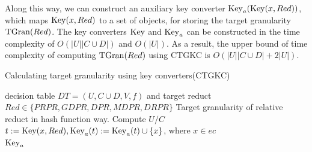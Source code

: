 \documentclass[review]{elsarticle}
\begin{document}
		\noindent Along this way, we can construct an auxiliary key converter ${\rm Key}_a({\rm Key}(x,Red))$, which maps ${\rm Key}(x,Red)$ to a set of objects, for storing the target granularity ${\rm TGran}(Red)$. The key converters ${\rm Key}$ and ${\rm Key}_a$ can be constructed in the time complexity of $O(|U||C \cup D|)$ and $O(|U|)$. As a result, the upper bound of time complexity of computing ${\rm TGran}(Red)$ using CTGKC is $O(|U||C \cup D|+2|U|)$.
		\begin{algorithm}[htb]
			\caption{Calculating target granularity using key converters(CTGKC)}
			\label{CTGKC}
			\begin{algorithmic}[1]
				\Require decision table $DT=(U, C \cup D,V,f)$ and target reduct $Red \in \{PRPR,GDPR,DPR,MDPR,DRPR\}$
				\Ensure Target granularity of relative reduct in hash function way.
				\State Compute $U/C$
				\State $t:={\rm Key}(x,Red), {\rm Key}_a(t):= {\rm Key}_a(t) \cup \{x\}$, where $x \in ec$
				\EndFor\\
				\Return ${\rm Key}_a$
			\end{algorithmic}
		\end{algorithm}
\end{document}
